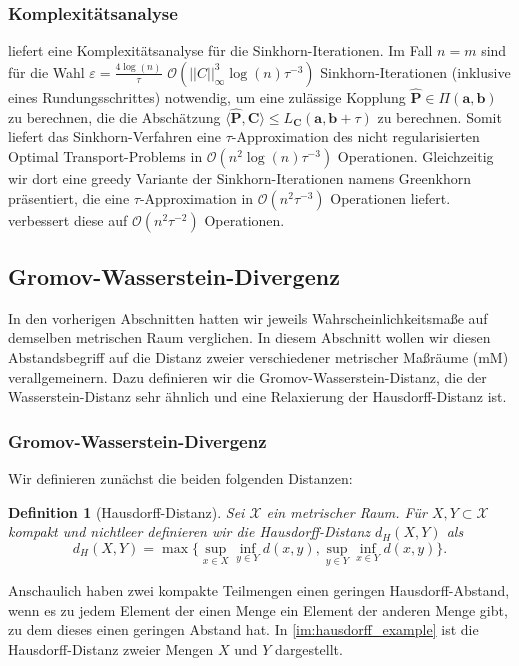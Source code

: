 \documentclass[11pt,a4paper]{article}
\def\emph#1{\textit{#1}}
\newtheorem{definition}[theorem]{Definition}
\numberwithin{equation}{section}
\begin{document}
	\subsubsection{Komplexitätsanalyse}
	\cite{altschuler2017near} liefert eine Komplexitätsanalyse für die Sinkhorn-Iterationen. Im Fall $n=m$ sind für die Wahl $\varepsilon = \frac{4 \log (n)}{\tau}$ $\mathcal{O}(||C||_\infty^3 \log (n)\tau ^{-3})$ Sinkhorn-Iterationen (inklusive eines Rundungsschrittes) notwendig, um eine zulässige Kopplung $\hat{\boldsymbol{P}} \in \Pi(\boldsymbol{a}, \boldsymbol{b})$ zu berechnen, die die Abschätzung $\langle \hat{\boldsymbol{P}}, \boldsymbol{C} \rangle \leq L_{\boldsymbol{C}}(\boldsymbol{a}, \boldsymbol{b} +  \tau)$ zu berechnen. Somit liefert das Sinkhorn-Verfahren eine $\tau$-Approximation des nicht regularisierten Optimal Transport-Problems in $\mathcal{O}(n^2 \log (n)\tau ^{-3})$ Operationen.
	Gleichzeitig wir dort eine greedy Variante der Sinkhorn-Iterationen namens Greenkhorn präsentiert, die eine $\tau$-Approximation in $\mathcal{O}(n^2\tau^{-3})$ Operationen liefert.
	\cite{dvurechensky2018computational} verbessert diese auf $\mathcal{O}(n^2\tau^{-2})$ Operationen.
	\subsection{Gromov-Wasserstein-Divergenz}
	In den vorherigen Abschnitten hatten wir jeweils Wahrscheinlichkeitsmaße auf demselben metrischen Raum verglichen. In diesem Abschnitt wollen wir diesen Abstandsbegriff auf die Distanz zweier verschiedener metrischer Maßräume (mM) verallgemeinern. Dazu definieren wir die Gromov-Wasserstein-Distanz, die der Wasserstein-Distanz sehr ähnlich und eine Relaxierung der Hausdorff-Distanz ist.
	
	\subsubsection{Gromov-Wasserstein-Divergenz}
	\cite{vialard2019elementary}
	Wir definieren zunächst die beiden folgenden Distanzen:
	
	\begin{definition}[Hausdorff-Distanz]
		Sei $\mathscr{X}$ ein metrischer Raum.
		Für  $X,Y \subset \mathscr{X}$ kompakt und nichtleer definieren wir die \emph{Hausdorff-Distanz} $d_H(X,Y)$ als
		\begin{equation}
		d_H(X,Y) = \max \lbrace \sup_{x \in X} \inf_{y \in Y} d(x,y), \sup_{y \in Y} \inf_{x \in Y} d(x,y) \rbrace .
		\end{equation} 
		
	\end{definition}
	Anschaulich haben zwei kompakte Teilmengen einen geringen Hausdorff-Abstand, wenn es zu jedem Element der einen Menge ein Element der anderen Menge gibt, zu dem dieses einen geringen Abstand hat. In \autoref{im:hausdorff_example} ist die Hausdorff-Distanz zweier Mengen $X$ und $Y$ dargestellt.
	
\end{document}
